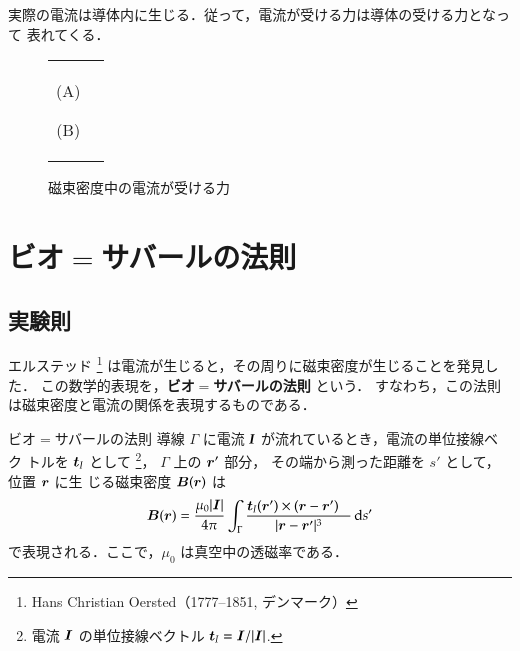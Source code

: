     実際の電流は導体内に生じる．従って，電流が受ける力は導体の受ける力となって
    表れてくる．
        \begin{figure}[hbt]
            \begin{tabular}{cc}
                \begin{minipage}{0.5\hsize}
                    \begin{center}
                        {Lorentz_force3.pdf}

                        (A)
                        \label{fig:I_Lorentz_force}
                    \end{center}
                \end{minipage}
                \begin{minipage}{0.5\hsize}
                    \begin{center}
                        {Lorentz_force4.pdf}

                        (B)
                    \end{center}
                \end{minipage}
            \end{tabular}
            \caption{磁束密度中の電流が受ける力}
        \end{figure}


\section{ビオ$=$サバールの法則}
    \subsection{実験則}
    エルステッド
        \footnote{
            Hans Christian Oersted（1777--1851, デンマーク）
        }
    は電流が生じると，その周りに磁束密度が生じることを発見した．
    この数学的表現を，\textbf{ビオ$=$サバールの法則} という．
    すなわち，この法則は磁束密度と電流の関係を表現するものである．
        \begin{myshadebox}{ビオ$=$サバールの法則}
            \;\;\;導線 $\Gamma$ に電流 $\textit{\textbf{I}}$ が流れているとき，電流の単位接線ベク
            トルを $\boldsymbol{t}_{I}$ として
            \footnote{
               電流 $\boldsymbol{I}$ の単位接線ベクトル $\boldsymbol{t}_{I} = \boldsymbol{I}/|\boldsymbol{I}|$.
            }，
            $\Gamma$ 上の $\boldsymbol{r}'$ 部分，
            その端から測った距離を $s'$ として，位置 $\boldsymbol{r}$ に生
            じる磁束密度 $\boldsymbol{B}(\boldsymbol{r})$ は
                \begin{align}\label{Bior=savart'slow1}
                    \bB(\br)
                    =\frac{\mu_{0}|\bI|}{4\pi}
                     \int_{\Gamma}\frac{\bt_{I}(\br')\times
                             (\br-\br')
                            \;\;\;}{|\br-\br'|^{3}}\df s'
                \end{align}
            で表現される．ここで，$\mu_{0}$ は真空中の透磁率である．
        \end{myshadebox}

